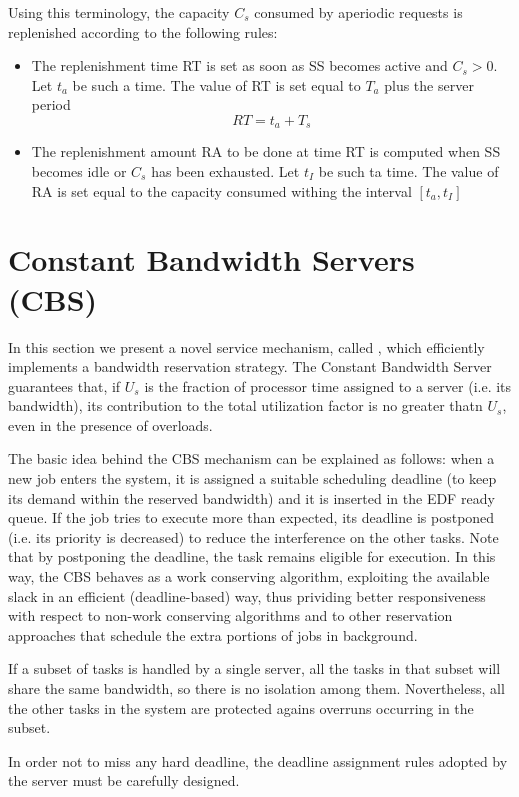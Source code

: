 Using this terminology, the capacity $C_s$ consumed by aperiodic requests is replenished according to the following rules:
\begin{itemize}
    \item The replenishment time RT is set as soon as SS becomes active and $C_s > 0$. Let $t_a$ be such a time. The value of RT is set equal to $T_a$ plus the server period
     \[RT = t_a + T_s\]
    \item The replenishment amount RA to be done at time RT is computed when SS becomes idle or $C_s$ has been exhausted. Let $t_I$ be such ta time. The value of RA is set equal to the capacity consumed withing the interval $[t_a, t_I]$ 
\end{itemize}

\section{Constant Bandwidth Servers (CBS)}
In this section we present a novel service mechanism, called , which efficiently implements a bandwidth reservation strategy. The Constant Bandwidth Server guarantees that, if $U_s$ is the fraction of processor time assigned to a server (i.e. its bandwidth), its contribution to the total utilization factor is no greater thatn $U_s$, even in the presence of overloads. 

The basic idea behind the CBS mechanism can be explained as follows: when a new job enters the system, it is assigned a suitable scheduling deadline (to keep its demand within the reserved bandwidth) and it is inserted in the EDF ready queue. If the job tries to execute more than expected, its deadline is postponed (i.e. its priority is decreased) to reduce the interference on the other tasks. Note that by postponing the deadline, the task remains eligible for execution. In this way, the CBS behaves as a work conserving algorithm, exploiting the available slack in an efficient (deadline-based) way, thus prividing better responsiveness with respect to non-work conserving algorithms and to other reservation approaches that schedule the extra portions of jobs in background.

If a subset of tasks is handled by a single server, all the tasks in that subset will share the same bandwidth, so there is no isolation among them. Novertheless, all the other tasks in the system are protected agains overruns occurring in the subset.

In order not to miss any hard deadline, the deadline assignment rules adopted by the server must be carefully designed.


